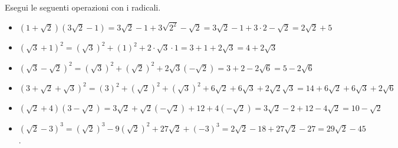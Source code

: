  \begin{esempio}
Esegui le seguenti operazioni con i radicali.
\begin{itemize}
 \item \((1+\sqrt{2})(3\sqrt{2}-1)=3\sqrt{2}-1+3\sqrt {2^2}-\sqrt{2}=
        3\sqrt{2}-1+3\cdot 2-\sqrt{2}=2\sqrt{2}+5\)
 \item \((\sqrt{3}+1)^2=(\sqrt{3})^2+(1)^2+2\cdot \sqrt{3}\cdot 1=
        3+1+2\sqrt{3}=4+2\sqrt{3}\)
 \item \((\sqrt{3}-\sqrt{2})^2=(\sqrt{3})^2+(\sqrt{2})^2+2 \sqrt{3} 
(-\sqrt{2})=
        3+2-2\sqrt 6=5-2\sqrt 6\)
 \item \((3+\sqrt{2}+\sqrt{3})^2=
        (3)^2+(\sqrt{2})^2+(\sqrt{3})^2+6 \sqrt{2}+6 \sqrt{3}+2 \sqrt{2} 
\sqrt{3}=
        14+6\sqrt{2}+6\sqrt{3}+2\sqrt 6\)
 \item \((\sqrt{2}+4)(3-\sqrt{2})=3\sqrt{2} 
+\sqrt{2}(-\sqrt{2})+12+4(-\sqrt{2})=
        3\sqrt{2}-2+12-4\sqrt{2}=10-\sqrt{2}\)
 \item \((\sqrt{2}-3)^3=(\sqrt{2})^3-9(\sqrt{2})^2+27\sqrt{2}+(-3)^3=
        2\sqrt{2}-18+27\sqrt{2}-27=29\sqrt{2}-45\).
\end{itemize}
 \end{esempio}

